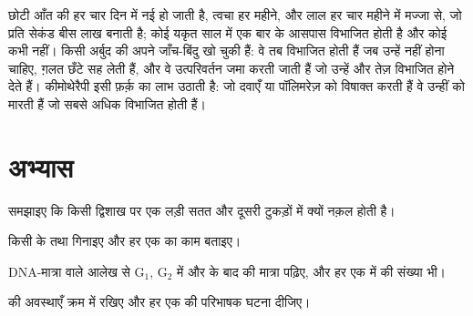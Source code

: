 \begin{example}[आवर्तन]\label{ex:b1:replication-mitosis:turnover}
छोटी आँत की  हर चार दिन में नई हो जाती है, त्वचा हर महीने, और लाल
 हर चार महीने में मज्जा से, जो प्रति सेकंड बीस लाख बनाती है;
कोई यकृत  साल में एक बार के आसपास विभाजित होती है और कोई 
कभी नहीं। किसी अर्बुद की  अपने जाँच-बिंदु खो चुकी हैं: वे तब
विभाजित होती हैं जब उन्हें नहीं होना चाहिए, ग़लत छँटे  सह लेती
हैं, और वे उत्परिवर्तन जमा करती जाती हैं जो उन्हें और तेज़ विभाजित होने
देते हैं। कीमोथेरैपी इसी फ़र्क़ का लाभ उठाती है: जो दवाएँ  या
पॉलिमरेज़ को विषाक्त करती हैं वे उन्हीं  को मारती हैं जो सबसे
अधिक विभाजित होती हैं।
\end{example}

\section{अभ्यास}

\begin{exercise}[$\star$]\label{exo:b1:replication-mitosis:1}
समझाइए कि किसी द्विशाख पर एक लड़ी सतत और दूसरी टुकड़ों में क्यों नक़ल
होती है।
\end{exercise}

\begin{exercise}[$\star$]\label{exo:b1:replication-mitosis:2}
किसी  के  तथा  गिनाइए और हर एक का काम
बताइए।
\end{exercise}

\begin{exercise}[$\star$]\label{exo:b1:replication-mitosis:3}
DNA-मात्रा वाले आलेख से G$_1$, G$_2$ में और  के बाद 
की मात्रा पढ़िए, और हर एक में  की संख्या भी।
\end{exercise}

\begin{exercise}[$\star$]\label{exo:b1:replication-mitosis:4}
 की अवस्थाएँ क्रम में रखिए और हर एक की परिभाषक घटना दीजिए।
\end{exercise}

